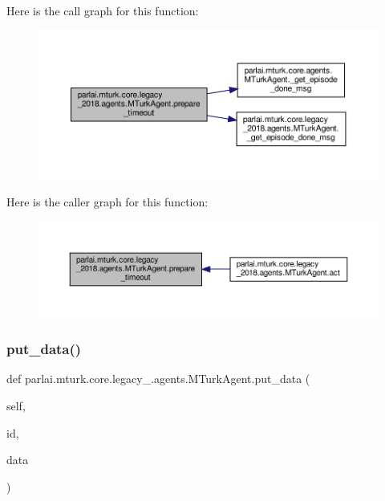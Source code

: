 Here is the call graph for this function\+:
\nopagebreak
\begin{figure}[H]
\begin{center}
\leavevmode
\includegraphics[width=350pt]{classparlai_1_1mturk_1_1core_1_1legacy__2018_1_1agents_1_1MTurkAgent_a8b3209004d4c83fdb11cacb82528e871_cgraph}
\end{center}
\end{figure}
Here is the caller graph for this function\+:
\nopagebreak
\begin{figure}[H]
\begin{center}
\leavevmode
\includegraphics[width=350pt]{classparlai_1_1mturk_1_1core_1_1legacy__2018_1_1agents_1_1MTurkAgent_a8b3209004d4c83fdb11cacb82528e871_icgraph}
\end{center}
\end{figure}
\mbox{\label{classparlai_1_1mturk_1_1core_1_1legacy__2018_1_1agents_1_1MTurkAgent_abcc954a77ce4be0d6c51b65d51553c07}} 
\subsubsection{\texorpdfstring{put\+\_\+data()}{put\_data()}}
{\footnotesize\ttfamily def parlai.\+mturk.\+core.\+legacy\+\_.\+agents.\+M\+Turk\+Agent.\+put\+\_\+data (\begin{DoxyParamCaption}\item[{}]{self,  }\item[{}]{id,  }\item[{}]{data }\end{DoxyParamCaption})}

